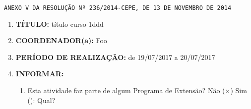 \documentclass[12pt,a4paper,oneside]{article}%
\begin{document}
\fancyfoot[L]{
    \thepage
}
\fancyfoot[C]{}
\texttt{ANEXO V DA RESOLUÇÃO Nº 236/2014-CEPE, DE 13 DE NOVEMBRO DE 2014}%
\begin{flushright}%

\end{flushright}%
\hrulefill%
\begin{enumerate}%
\item%
\textbf{TÍTULO: }%
título curso 1ddd%
\item%
\textbf{COORDENADOR(a): }%
Foo%
\item%
\textbf{PERÍODO DE REALIZAÇÃO: }%
de 19/07/2017 a 20/07/2017%
\item%
\textbf{INFORMAR: }%
\begin{mdframed}[innertopmargin=5pt, innerleftmargin=3pt, innerrightmargin=3pt]%
\begin{enumerate}%
\scriptsize%
\item%
Esta atividade faz parte de algum Programa de Extensão? %
Não ($\times$) Sim (): Qual? %


\end{enumerate}
\end{mdframed}
\end{enumerate}
\end{document}
